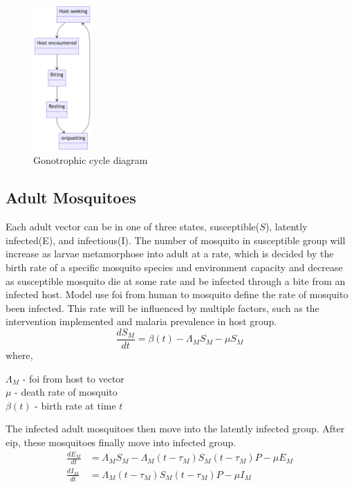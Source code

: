 \documentclass[a4paper, 12pt, twoside]{article}
\begin{document}
\begin{figure}[htpb]
	\centering
	\includegraphics[width=0.2\textwidth]{gonotrophic-cycle-diagram}
	\caption{Gonotrophic cycle diagram}
	\label{fig:gonotrophic-cycle-diagram}
\end{figure}

\subsection{Adult Mosquitoes}
Each adult vector can be in one of three states, susceptible($S$), latently infected(E), and infectious(I).
The number of mosquito in susceptible group will increase as larvae metamorphose into adult at a rate, which is decided by the birth rate of a specific mosquito species and environment capacity and decrease as susceptible mosquito die at some rate and be infected through a bite from an infected host.
Model use \gls{foi} from human to mosquito define the rate of mosquito been infected.
This rate will be influenced by multiple factors, such as the intervention implemented and malaria prevalence in host group.
\begin{equation}
  \frac{dS_M}{dt} = \beta(t) - \Lambda_M S_M - \mu S_M
\end{equation}
where,
\begin{centering}
  $\Lambda_M$ - \gls{foi} from host to vector \\
  $\mu$ - death rate of mosquito\\
  $\beta(t)$ - birth rate at time  $t$\\
\end{centering}

The infected adult mosquitoes then move into the latently infected group.
After \gls{eip}, these mosquitoes finally move into infected group.
\begin{align}
  \frac{dE_M}{dt} & = \Lambda_M S_M - \Lambda_M (t- \tau_M) S_M (t - \tau_M) P - \mu E_M\\
  \frac{dI_M}{dt} & = \Lambda_M (t- \tau_M) S_M (t - \tau_M) P - \mu I_M
\end{align}
\end{document}

